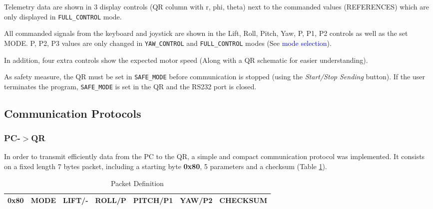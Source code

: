 \documentclass{article}
\newcommand\todo[1]{\textcolor{blue}{#1}} %
\begin{document}
Telemetry data are shown in 3 display controls (QR column with r, phi, theta) next to the commanded values (REFERENCES) which are only displayed in \texttt{FULL\_CONTROL} mode.

All commanded signals from the keyboard and joystick are shown in the Lift, Roll, Pitch, Yaw, P, P1, P2 controls as well as the set MODE. P, P2, P3 values are only changed in \texttt{YAW\_CONTROL} and \texttt{FULL\_CONTROL} modes (See \todo{mode selection}).

In addition, four extra controls show the expected motor speed (Along with a QR schematic for easier understanding).

As safety measure, the QR must be set in \texttt{SAFE\_MODE} before communication is stopped (using the \emph{Start/Stop Sending} button). If the user terminates the program, \texttt{SAFE\_MODE} is set in the QR and the RS232 port is closed.

\subsection{Communication Protocols}


\subsubsection{PC-$>$QR}
In order to transmit efficiently data from the PC to the QR, a simple and compact communication protocol was implemented. It consists on a fixed length 7 bytes packet, including a starting byte \textbf{0x80}, 5 parameters and a checksum (Table \ref{tbl:PkgDefinition}). 

\begin{table}[ht]
\centering
\caption{Packet Definition}
\begin{tabular}{|c|c|c|c|c|c|c|}
\hline 
0x80 & MODE & LIFT/- & ROLL/P & PITCH/P1 & YAW/P2 & CHECKSUM \\ 
\hline 
\end{tabular} 
\label{tbl:PkgDefinition}
\end{table}
\end{document}
